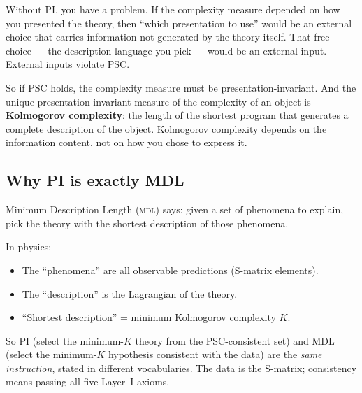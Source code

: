 \documentclass[11pt,a4paper]{article}
\newcommand{\term}[1]{\textbf{#1}}
\newcommand{\MDL}{\textsc{mdl}}
\begin{document}
Without PI, you have a problem.  If the complexity measure depended on how you presented
the theory, then ``which presentation to use'' would be an external choice that carries
information not generated by the theory itself.  That free choice — the description
language you pick — would be an external input.  External inputs violate PSC.

So if PSC holds, the complexity measure must be presentation-invariant.  And the unique
presentation-invariant measure of the complexity of an object is \term{Kolmogorov
complexity}: the length of the shortest program that generates a complete description of
the object.  Kolmogorov complexity depends on the information content, not on how you
chose to express it.

\subsection{Why PI is exactly MDL}

Minimum Description Length (\MDL) says: given a set of phenomena to explain, pick the
theory with the shortest description of those phenomena.

In physics:
\begin{itemize}[itemsep=2pt]
  \item The ``phenomena'' are all observable predictions (S-matrix elements).
  \item The ``description'' is the Lagrangian of the theory.
  \item ``Shortest description'' = minimum Kolmogorov complexity $K$.
\end{itemize}

So PI (select the minimum-$K$ theory from the PSC-consistent set) and MDL
(select the minimum-$K$ hypothesis consistent with the data) are the \emph{same
instruction}, stated in different vocabularies.  The data is the S-matrix; consistency
means passing all five Layer~I axioms.
\end{document}
